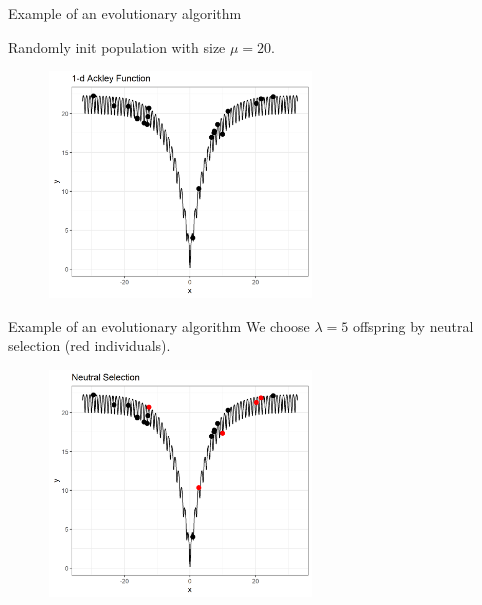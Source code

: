 \documentclass[11pt,compress,t,notes=noshow, xcolor=table]{beamer}
\begin{document}
\begin{vbframe}{Example of an evolutionary algorithm}

Randomly init population with size $\mu = 20$.
\vspace{0.5cm}

\begin{center}
\begin{figure}
  \includegraphics[height = 6cm, width = 7cm]{figure_man/1dim-ackley-func-2.png}
\end{figure}
\end{center}

\end{vbframe}

\begin{vbframe}{Example of an evolutionary algorithm}
We choose $\lambda = 5$ offspring by neutral selection (red individuals).

\vspace{0.5cm}

\begin{center}
\begin{figure}
  \includegraphics[height = 6cm, width = 7cm]{figure_man/neutral-selec.png}
\end{figure}
\end{center}

\end{vbframe}
\end{document}
